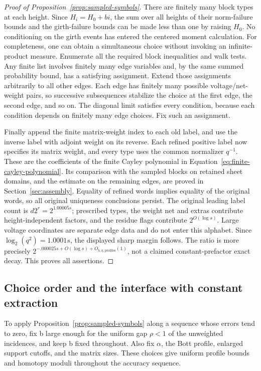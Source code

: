 \begin{proof}[Proof of Proposition~\ref{prop:sampled-symbols}]
There are finitely many block types at each height.  Since
\(H_i=H_0+bi\), the sum over all heights of their norm-failure bounds and the
girth-failure bounds can be made less than one by raising \(H_0\).  No
conditioning on the girth events has entered the centered moment calculation.
For completeness, one can obtain a simultaneous choice without invoking an
infinite-product measure.  Enumerate all the required block inequalities and
walk tests.  Any finite list involves finitely many edge variables and, by
the same summed probability bound, has a satisfying assignment.  Extend those
assignments arbitrarily to all other edges.  Each edge has finitely many
possible voltage/net-weight pairs, so successive subsequences stabilize the
choice at the first edge, the second edge, and so on.  The diagonal limit
satisfies every condition, because each condition depends on finitely many
edge choices.  Fix such an assignment.

Finally append the finite matrix-weight index to each old label, and use the
inverse label with adjoint weight on its reverse.  Each refined positive
label now specifies its matrix weight, and every type uses the common
normalizer \(q^{-1}\).  These are the coefficients of the finite Cayley
polynomial in Equation~\eqref{eq:finite-cayley-polynomial}.  Its comparison
with the sampled blocks on retained sheet domains, and the estimate on the
remaining edges, are proved in Section~\ref{sec:assembly}.
Equality of refined words implies equality of
the original words, so all original uniqueness conclusions persist.  The
original leading label count is \(d2^r=2^{1.00005s}\); prescribed types, the
weight net and extras contribute height-independent factors, and the residue
flags contribute \(2^{O(\log s)}\).  Large voltage coordinates are separate
edge data and do not enter this alphabet.  Since
\(\log_2(q^2)=1.0001s\), the displayed sharp margin follows.  The ratio is
more precisely \(2^{-.000025s+O(\log s)+O_{b,\eta,\mathrm{profiles}}(1)}\),
not a claimed constant-prefactor exact decay.  This proves all assertions.
\end{proof}

\subsection{Choice order and the interface with constant extraction}

To apply Proposition~\ref{prop:sampled-symbols} along a sequence whose errors
tend to zero, fix b large enough for the uniform gap \(\rho<1\) of the
unweighted incidences, and keep b fixed throughout.  Also fix \(\alpha\),
the Bott profile, enlarged support cutoffs, and the matrix sizes.  These
choices give uniform profile bounds and homotopy moduli throughout the
accuracy sequence.

